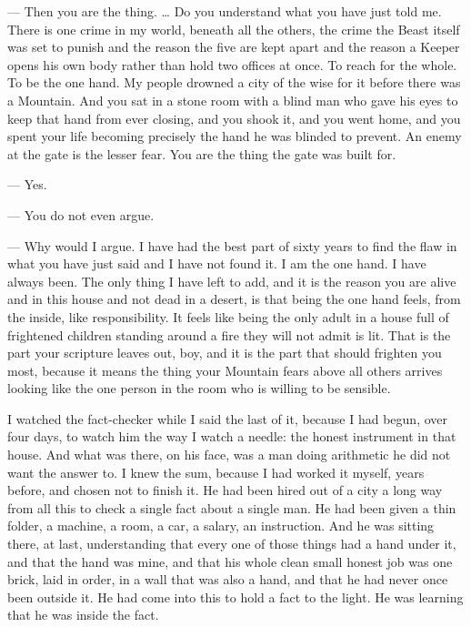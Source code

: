 \begin{room}

--- Then you are the thing. \ldots{} Do you understand what you have just told me. There is one crime in my world, beneath all the others, the crime the Beast itself was set to punish and the reason the five are kept apart and the reason a Keeper opens his own body rather than hold two offices at once. To reach for the whole. To be the one hand. My people drowned a city of the wise for it before there was a Mountain. And you sat in a stone room with a blind man who gave his eyes to keep that hand from ever closing, and you shook it, and you went home, and you spent your life becoming precisely the hand he was blinded to prevent. An enemy at the gate is the lesser fear. You are the thing the gate was built for.

--- Yes.

--- You do not even argue.

--- Why would I argue. I have had the best part of sixty years to find the flaw in what you have just said and I have not found it. I am the one hand. I have always been. The only thing I have left to add, and it is the reason you are alive and in this house and not dead in a desert, is that being the one hand feels, from the inside, like responsibility. It feels like being the only adult in a house full of frightened children standing around a fire they will not admit is lit. That is the part your scripture leaves out, boy, and it is the part that should frighten you most, because it means the thing your Mountain fears above all others arrives looking like the one person in the room who is willing to be sensible.

\end{room}

I watched the fact-checker while I said the last of it, because I had begun, over four days, to watch him the way I watch a needle: the honest instrument in that house. And what was there, on his face, was a man doing arithmetic he did not want the answer to. I knew the sum, because I had worked it myself, years before, and chosen not to finish it. He had been hired out of a city a long way from all this to check a single fact about a single man. He had been given a thin folder, a machine, a room, a car, a salary, an instruction. And he was sitting there, at last, understanding that every one of those things had a hand under it, and that the hand was mine, and that his whole clean small honest job was one brick, laid in order, in a wall that was also a hand, and that he had never once been outside it. He had come into this to hold a fact to the light. He was learning that he was inside the fact.\par


